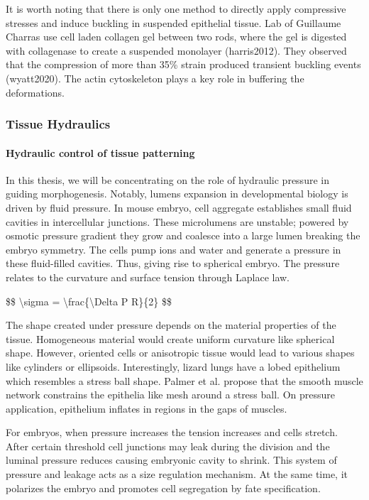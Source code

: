 \documentclass[
]{article}
\begin{document}
It is worth noting that there is only one method to directly apply
compressive stresses and induce buckling in suspended epithelial tissue.
Lab of Guillaume Charras use cell laden collagen gel between two rods,
where the gel is digested with collagenase to create a suspended
monolayer (harris2012). They observed that the compression of more than
35\% strain produced transient buckling events (wyatt2020). The actin
cytoskeleton plays a key role in buffering the deformations.

\hypertarget{tissue-hydraulics}{%
\subsubsection{Tissue Hydraulics}\label{tissue-hydraulics}}

\hypertarget{hydraulic-control-of-tissue-patterning}{%
\paragraph{Hydraulic control of tissue
patterning}\label{hydraulic-control-of-tissue-patterning}}

In this thesis, we will be concentrating on the role of hydraulic
pressure in guiding morphogenesis. Notably, lumens expansion in
developmental biology is driven by fluid pressure. In mouse embryo, cell
aggregate establishes small fluid cavities in intercellular junctions.
These microlumens are unstable; powered by osmotic pressure gradient
they grow and coalesce into a large lumen breaking the embryo symmetry.
The cells pump ions and water and generate a pressure in these
fluid-filled cavities. Thus, giving rise to spherical embryo. The
pressure relates to the curvature and surface tension through Laplace
law.

\$\$ \textbackslash sigma = \textbackslash frac\{\textbackslash Delta P
R\}\{2\} \$\$

The shape created under pressure depends on the material properties of
the tissue. Homogeneous material would create uniform curvature like
spherical shape. However, oriented cells or anisotropic tissue would
lead to various shapes like cylinders or ellipsoids. Interestingly,
lizard lungs have a lobed epithelium which resembles a stress ball
shape. Palmer et al. propose that the smooth muscle network constrains
the epithelia like mesh around a stress ball. On pressure application,
epithelium inflates in regions in the gaps of muscles.

For embryos, when pressure increases the tension increases and cells
stretch. After certain threshold cell junctions may leak during the
division and the luminal pressure reduces causing embryonic cavity to
shrink. This system of pressure and leakage acts as a size regulation
mechanism. At the same time, it polarizes the embryo and promotes cell
segregation by fate specification.
\end{document}
